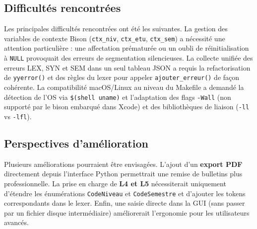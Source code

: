 \documentclass[10pt,a4paper]{article}
\begin{document}
\subsection{Difficultés rencontrées}

Les principales difficultés rencontrées ont été les suivantes. La gestion des
variables de contexte Bison (\texttt{ctx\_niv}, \texttt{ctx\_etu}, \texttt{ctx\_sem})
a nécessité une attention particulière : une affectation prématurée ou un oubli de
réinitialisation à \texttt{NULL} provoquait des erreurs de segmentation silencieuses.
La collecte unifiée des erreurs LEX, SYN et SEM dans un seul tableau JSON a
requis la refactorisation de \texttt{yyerror()} et des règles du lexer pour
appeler \texttt{ajouter\_erreur()} de façon cohérente.
La compatibilité macOS/Linux au niveau du Makefile a demandé la détection de
l'OS via \texttt{\$(shell uname)} et l'adaptation des flags \texttt{-Wall} (non supporté
par le bison embarqué dans Xcode) et des bibliothèques de liaison (\texttt{-ll} vs \texttt{-lfl}).

\subsection{Perspectives d'amélioration}

Plusieurs améliorations pourraient être envisagées. L'ajout d'un \textbf{export PDF}
directement depuis l'interface Python 
permettrait une remise de bulletins plus professionnelle. La prise en charge de
\textbf{L4 et L5} nécessiterait uniquement d'étendre les énumérations \texttt{CodeNiveau}
et \texttt{CodeSemestre} et d'ajouter les tokens correspondants dans le lexer.
Enfin, une saisie directe dans la GUI (sans passer par un fichier disque
intermédiaire) améliorerait l'ergonomie pour les utilisateurs avancés.
\end{document}
